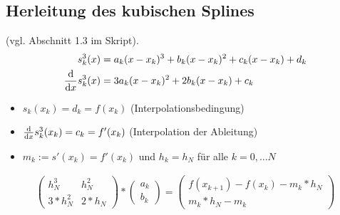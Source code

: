 \documentclass[a4paper, 11pt, ngerman]{scrartcl}
\begin{document}
\subsection{Herleitung des kubischen Splines}
(vgl. Abschnitt 1.3 im Skript). 
\begin{align}
	s_k^3(x) &= a_k (x-x_k)^3 + b_k (x-x_k)^2 + c_k (x-x_k) + d_k \label{eq: ansatz_kubspline} \\ 
	\frac{\mathrm{d}}{\mathrm{d} x }{s_k^3} (x) &= 3a_k (x-x_k)^2 + 2b_k (x-x_k) + c_k  \label{eq: ansatz_kubsplineabl}
\end{align}
\begin{itemize}
	\item $s_k(x_k) = d_k = f(x_k)$ (Interpolationsbedingung)
	\item $\frac{\mathrm{d}}{\mathrm{d} x }s_k^3(x_k) = c_k = f'(x_k)$ (Interpolation der Ableitung)
	\item $m_k := s'(x_k) = f'(x_k)$ und $h_k = h_N$ für alle $k=0, \dots N$ 
\end{itemize}
\begin{align}
	\begin{pmatrix} 	h_N^3 & h_N^2 \\ 3*h_N^2 & 2*h_N    \end{pmatrix} * \begin{pmatrix} a_k \\ b_k 	\end{pmatrix}
	= \begin{pmatrix} 	f(x_{k+1}) - f(x_k) - m_k*h_N \\ m_k * h_N - m_k  \end{pmatrix}
\end{align}

\newpage
\end{document}
